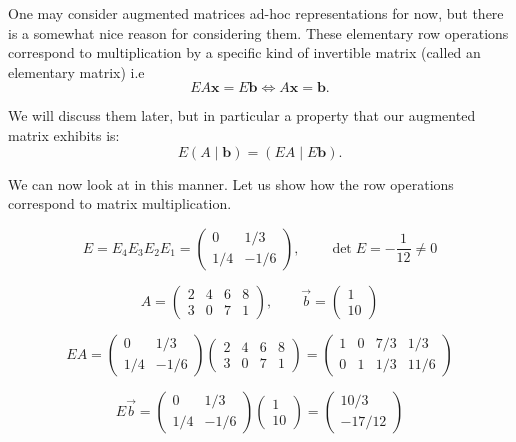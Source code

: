 \begin{remark}
One may consider augmented matrices ad-hoc representations for now,
but there is a somewhat nice reason for considering them. These elementary
row operations correspond to multiplication by a specific kind of invertible matrix
(called an elementary matrix) i.e
\[
EA\mathbf{x} = E\mathbf{b} \iff A\mathbf{x} = \mathbf{b}.
\]

We will discuss them later, but in particular a property that our augmented matrix exhibits is:
\[
E(A \mid \mathbf{b}) = (EA \mid E\mathbf{b}).
\]

We can now look at  in this manner.
Let us show how the row operations correspond to matrix multiplication.


\[
E = E_4 E_3 E_2 E_1 = \begin{pmatrix} 0 & 1/3 \\ 1/4 & -1/6 \end{pmatrix}, \qquad \det E = -\frac{1}{12} \neq 0
\]

\[
A = \begin{pmatrix} 2 & 4 & 6 & 8 \\ 3 & 0 & 7 & 1 \end{pmatrix}, \qquad \vec{b} = \begin{pmatrix} 1 \\ 10 \end{pmatrix}
\]

\[
EA = \begin{pmatrix} 0 & 1/3 \\ 1/4 & -1/6 \end{pmatrix} \begin{pmatrix} 2 & 4 & 6 & 8 \\ 3 & 0 & 7 & 1 \end{pmatrix} = \begin{pmatrix} 1 & 0 & 7/3 & 1/3 \\ 0 & 1 & 1/3 & 11/6 \end{pmatrix}
\]

\[
E\vec{b} = \begin{pmatrix} 0 & 1/3 \\ 1/4 & -1/6 \end{pmatrix} \begin{pmatrix} 1 \\ 10 \end{pmatrix} = \begin{pmatrix} 10/3 \\ -17/12 \end{pmatrix}
\]


\end{remark}
